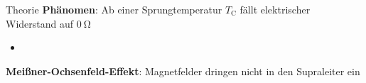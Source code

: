 \begin{frame}{Theorie}
\textbf{Phänomen}: Ab einer Sprungtemperatur $T_{\mathup{C}}$ fällt elektrischer Widerstand auf $\SI{0}{\ohm}$ \\
\begin{itemize}
  \item
\end{itemize}


\textbf{Meißner-Ochsenfeld-Effekt}: Magnetfelder dringen nicht in den Supraleiter ein




\end{frame}
